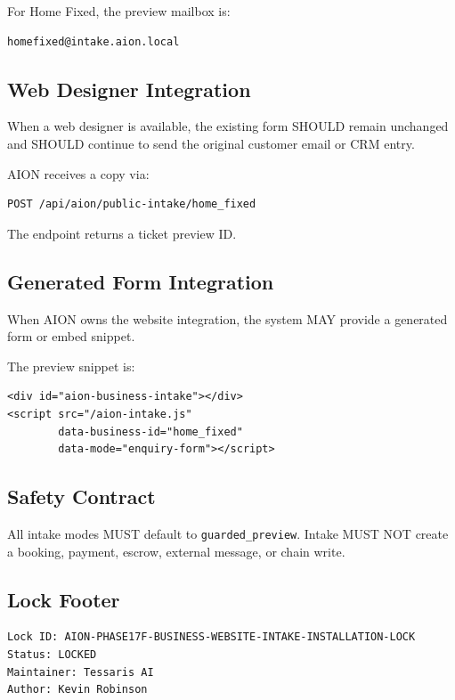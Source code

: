 For Home Fixed, the preview mailbox is:

\begin{verbatim}
homefixed@intake.aion.local
\end{verbatim}

\subsection{Web Designer Integration}

When a web designer is available, the existing form SHOULD remain unchanged and SHOULD continue to send the original customer email or CRM entry.

AION receives a copy via:

\begin{verbatim}
POST /api/aion/public-intake/home_fixed
\end{verbatim}

The endpoint returns a ticket preview ID.

\subsection{Generated Form Integration}

When AION owns the website integration, the system MAY provide a generated form or embed snippet.

The preview snippet is:

\begin{verbatim}
<div id="aion-business-intake"></div>
<script src="/aion-intake.js"
        data-business-id="home_fixed"
        data-mode="enquiry-form"></script>
\end{verbatim}

\subsection{Safety Contract}

All intake modes MUST default to \texttt{guarded\_preview}. Intake MUST NOT create a booking, payment, escrow, external message, or chain write.

\subsection{Lock Footer}

\begin{verbatim}
Lock ID: AION-PHASE17F-BUSINESS-WEBSITE-INTAKE-INSTALLATION-LOCK
Status: LOCKED
Maintainer: Tessaris AI
Author: Kevin Robinson
\end{verbatim}
